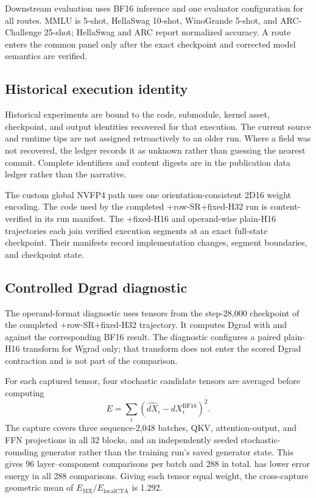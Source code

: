 Downstream evaluation uses BF16 inference and one evaluator configuration for
all routes. MMLU is 5-shot, HellaSwag 10-shot, WinoGrande 5-shot, and
ARC-Challenge 25-shot; HellaSwag and ARC report normalized accuracy. A route
enters the common panel only after the exact checkpoint and corrected model
semantics are verified.

\subsection{Historical execution identity}

Historical experiments are bound to the code, submodule, kernel asset,
checkpoint, and output identities recovered for that execution. The current
source and runtime tips are not assigned retroactively to an older run. Where
a field was not recovered, the ledger records it as unknown rather than
guessing the nearest commit. Complete identifiers and content digests are in
the publication data ledger rather than the narrative.

The custom global NVFP4 path uses one orientation-consistent 2D16 weight
encoding. The code used by the completed \mxfp{}+row-SR+fixed-H32 run is
content-verified in its run manifest. The \localcta{}+fixed-H16 and
operand-wise plain-H16 trajectories each join verified execution segments at
an exact full-state checkpoint. Their manifests record implementation changes,
segment boundaries, and checkpoint state.

\subsection{Controlled Dgrad diagnostic}
\label{app:dgrad-diagnostic}

The operand-format diagnostic uses tensors from the step-28,000 checkpoint of
the completed \mxfp{}+row-SR+fixed-H32 trajectory. It computes Dgrad with
\mxfp{} and \localcta{} against the corresponding BF16 result. The diagnostic
configures a paired plain-H16 transform for Wgrad only; that transform does
not enter the scored Dgrad contraction and is not part of the comparison.

For each captured tensor, four stochastic candidate tensors are averaged
before computing
\begin{equation}
  E=\sum_i\left(\widehat{dX}_i-dX_i^{\mathrm{BF16}}\right)^2.
\end{equation}
The capture covers three
sequence-2,048 batches, QKV, attention-output, and FFN projections in all 32
blocks, and an independently seeded stochastic-rounding generator rather than
the training run's saved generator state. This gives 96 layer--component
comparisons per batch and 288 in total.
\localcta{} has lower error energy in all 288 comparisons. Giving each tensor
equal weight, the cross-capture geometric mean of
$E_{\mathrm{MX}}/E_{\mathrm{localCTA}}$ is 1.292.

